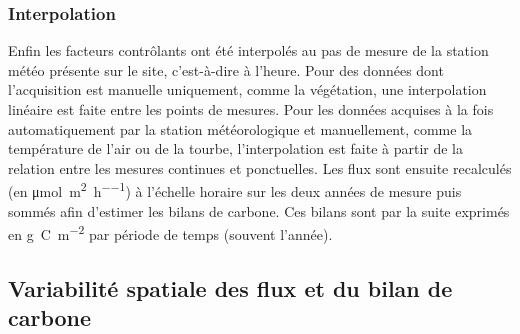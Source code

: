 \subsubsection{Interpolation}

Enfin les facteurs contrôlants ont été interpolés au pas de mesure de la station météo présente sur le site, c'est-à-dire à l'heure.
Pour des données dont l'acquisition est manuelle uniquement, comme la végétation, une interpolation linéaire est faite entre les points de mesures.
Pour les données acquises à la fois automatiquement par la station météorologique et manuellement, comme la température de l'air ou de la tourbe, l'interpolation est faite à partir de la relation entre les mesures continues et ponctuelles.
Les flux sont ensuite recalculés (en \si{\micro\mole\per\square\meter\per\hour}) à l'échelle horaire sur les deux années de mesure puis sommés afin d'estimer les bilans de carbone.
Ces bilans sont par la suite exprimés en \si{\gram C m^{-2}} par période de temps (souvent l'année).




\subsection{Variabilité spatiale des flux et du bilan de carbone}

